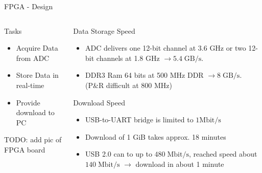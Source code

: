 \documentclass{beamer}
\begin{document}
\begin{frame}{FPGA - Design}
  \begin{columns}[T]
    \begin{column}{.5\textwidth}
      \begin{block}{Tasks}
        \begin{itemize}
        \item Acquire Data from ADC
        \item Store Data in real-time
        \item Provide download to PC
        \end{itemize}
      \end{block}
      TODO: add pic of FPGA board
    \end{column}
    \begin{column}{.5\textwidth}
      \begin{block}{Data Storage Speed}
        \begin{itemize}
        \item ADC delivers one 12-bit channel at 3.6 GHz or
          two 12-bit channels at 1.8 GHz $\rightarrow 5.4 \;\text{GB}/\text{s}$.
        \item DDR3 Ram 64 bits at 500 MHz DDR $\rightarrow 8 \;\text{GB}/\text{s}$.
          (P\&R difficult at 800 MHz)
        \end{itemize}
      \end{block}
      \begin{block}{Download Speed}
        \begin{itemize}
        \item USB-to-UART bridge is limited to $1 \text{Mbit}/\text{s}$
        \item Download of 1 GiB takes approx. 18 minutes
        \item USB 2.0 can to up to $480 \;\text{Mbit}/\text{s}$, reached speed
          about $140 \;\text{Mbit}/\text{s}$ $\rightarrow$ download in about 1 minute
        \end{itemize}
      \end{block}
    \end{column}
  \end{columns}
\end{frame}
\end{document}
